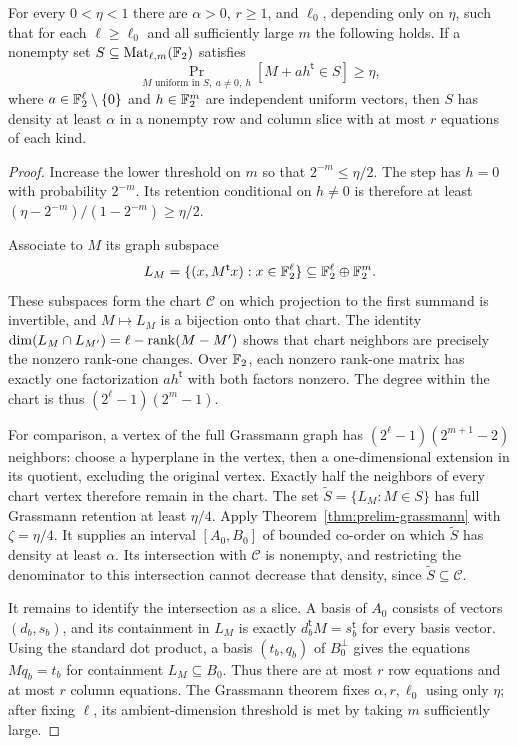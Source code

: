 \begin{lemma}
\label{lem:prelim-matrix-set}
For every $0<\eta<1$ there are $\alpha>0$, $r\geq1$, and
$\ell_0$, depending only on $\eta$, such that for each
$\ell\geq\ell_0$ and all sufficiently large $m$ the following holds.
If a nonempty set $S\subseteq\operatorname{Mat}_{\ell,m}(\mathbb F_2)$ satisfies
\[
 \Pr_{M\text{ uniform in }S,\ a\ne0,\ h}
       [M+ah^{\mathsf t}\in S]\geq\eta,
\]
where $a\in\mathbb F_2^\ell\setminus\{0\}$ and $h\in\mathbb F_2^m$ are
independent uniform vectors, then $S$ has density at least $\alpha$
in a nonempty row and column slice with at most $r$ equations of each
kind.
\end{lemma}

\begin{proof}
Increase the lower threshold on $m$ so that $2^{-m}\leq\eta/2$.
The step has $h=0$ with probability $2^{-m}$.  Its retention
conditional on $h\ne0$ is therefore at least
$(\eta-2^{-m})/(1-2^{-m})\geq\eta/2$.

Associate to $M$ its graph subspace
\[
 L_M=\{(x,M^{\mathsf t}x):x\in\mathbb F_2^\ell\}
       \subseteq\mathbb F_2^\ell\oplus\mathbb F_2^m.
\]
These subspaces form the chart $\mathcal C$ on which projection to the
first summand is invertible, and $M\mapsto L_M$ is a bijection onto
that chart.  The identity
$\dim(L_M\cap L_{M'})=\ell-\operatorname{rank}(M-M')$ shows that chart neighbors
are precisely the nonzero rank-one changes.  Over $\mathbb F_2$, each nonzero
rank-one matrix has exactly one factorization $ah^{\mathsf t}$ with
both factors nonzero.  The degree within the chart is thus
$(2^\ell-1)(2^m-1)$.

For comparison, a vertex of the full Grassmann graph has
$(2^\ell-1)(2^{m+1}-2)$ neighbors: choose a hyperplane in the vertex,
then a one-dimensional extension in its quotient, excluding the
original vertex.  Exactly half the neighbors of every chart vertex
therefore remain in the chart.  The set
$\widetilde S=\{L_M:M\in S\}$ has full Grassmann retention at least
$\eta/4$.  Apply Theorem~\ref{thm:prelim-grassmann} with
$\zeta=\eta/4$.  It supplies an interval $[A_0,B_0]$ of bounded
co-order on which $\widetilde S$ has density at least $\alpha$.
Its intersection with $\mathcal C$ is nonempty, and restricting the
denominator to this intersection cannot decrease that density,
since $\widetilde S\subseteq\mathcal C$.

It remains to identify the intersection as a slice.  A basis of
$A_0$ consists of vectors $(d_b,s_b)$, and its containment in $L_M$
is exactly $d_b^{\mathsf t}M=s_b^{\mathsf t}$ for every basis vector.
Using the standard dot product, a basis $(t_b,q_b)$ of $B_0^\perp$
gives the equations $Mq_b=t_b$ for containment $L_M\subseteq B_0$.
Thus there are at most $r$ row equations and at most $r$ column
equations.  The Grassmann theorem fixes $\alpha,r,\ell_0$ using
only $\eta$; after fixing $\ell$, its ambient-dimension threshold
is met by taking $m$ sufficiently large.
\end{proof}

